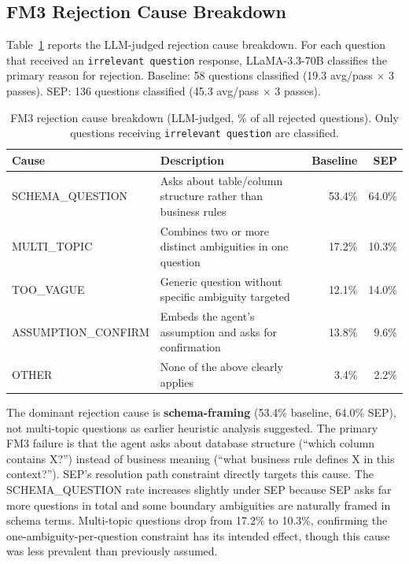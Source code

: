 \documentclass{article} %
\newcommand{\oursystem}{SEP} %
\begin{document}
\subsection{FM3 Rejection Cause Breakdown}

Table~\ref{tab:fm3_deep} reports the LLM-judged rejection cause breakdown.
For each question that received an \texttt{irrelevant question} response,
LLaMA-3.3-70B classifies the primary reason for rejection.
Baseline: 58 questions classified (19.3 avg/pass $\times$ 3 passes).
SEP: 136 questions classified (45.3 avg/pass $\times$ 3 passes).

\begin{table}[h]
\caption{FM3 rejection cause breakdown (LLM-judged, \% of all rejected questions).
Only questions receiving \texttt{irrelevant question} are classified.}
\label{tab:fm3_deep}
\begin{center}
\small
\begin{tabular}{p{3.8cm}p{5.2cm}rr}
\toprule
\textbf{Cause} & \textbf{Description} & \textbf{Baseline} & \textbf{SEP} \\
\midrule
SCHEMA\_QUESTION   & Asks about table/column structure rather than business rules
                   & 53.4\% & 64.0\% \\[3pt]
MULTI\_TOPIC       & Combines two or more distinct ambiguities in one question
                   & 17.2\% & 10.3\% \\[3pt]
TOO\_VAGUE         & Generic question without specific ambiguity targeted
                   & 12.1\% & 14.0\% \\[3pt]
ASSUMPTION\_CONFIRM & Embeds the agent's assumption and asks for confirmation
                   & 13.8\% &  9.6\% \\[3pt]
OTHER              & None of the above clearly applies
                   &  3.4\% &  2.2\% \\
\bottomrule
\end{tabular}
\end{center}
\end{table}

The dominant rejection cause is \textbf{schema-framing} (53.4\% baseline, 64.0\% SEP),
not multi-topic questions as earlier heuristic analysis suggested.
The primary FM3 failure is that the agent asks about database structure
(``which column contains X?'') instead of business meaning
(``what business rule defines X in this context?'').
\oursystem{}'s resolution path constraint directly targets this cause.
The SCHEMA\_QUESTION rate increases slightly under \oursystem{} because SEP asks far
more questions in total and some boundary ambiguities are naturally framed in schema terms.
Multi-topic questions drop from 17.2\% to 10.3\%, confirming the one-ambiguity-per-question
constraint has its intended effect, though this cause was less prevalent than previously assumed.
\end{document}
